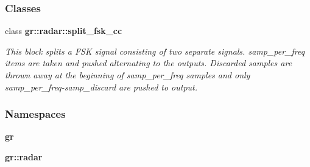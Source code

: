 \subsubsection*{Classes}
\begin{DoxyCompactItemize}
\item 
class {\bf gr\+::radar\+::split\+\_\+fsk\+\_\+cc}
\begin{DoxyCompactList}\small\item\em This block splits a F\+SK signal consisting of two separate signals. samp\+\_\+per\+\_\+freq items are taken and pushed alternating to the outputs. Discarded samples are thrown away at the beginning of samp\+\_\+per\+\_\+freq samples and only samp\+\_\+per\+\_\+freq-\/samp\+\_\+discard are pushed to output. \end{DoxyCompactList}\end{DoxyCompactItemize}
\subsubsection*{Namespaces}
\begin{DoxyCompactItemize}
\item 
 {\bf gr}
\item 
 {\bf gr\+::radar}
\end{DoxyCompactItemize}
